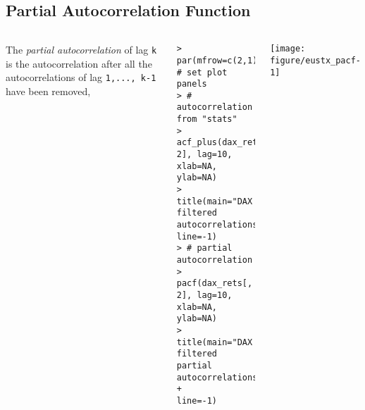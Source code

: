 \documentclass[10pt]{beamer}\usepackage[]{graphicx}\usepackage[]{color}
\makeatletter
\newenvironment{kframe}{%
 \def\at@end@of@kframe{}%
 \ifinner\ifhmode%
  \def\at@end@of@kframe{\end{minipage}}%
  \begin{minipage}{\columnwidth}%
 \fi\fi%
 \def\FrameCommand##1{\hskip\@totalleftmargin \hskip-\fboxsep
 \colorbox{shadecolor}{##1}\hskip-\fboxsep
     \hskip-\linewidth \hskip-\@totalleftmargin \hskip\columnwidth}%
 \MakeFramed {\advance\hsize-\width
   \@totalleftmargin\z@ \linewidth\hsize
   \@setminipage}}%
 {\par\unskip\endMakeFramed%
 \at@end@of@kframe}
\newenvironment{knitrout}{}{} %
\makeatother
\begin{document}
\subsection{Partial Autocorrelation Function}
\begin{frame}[fragile,t]{\subsecname}
\vspace{-1em}
\begin{block}{}
  \begin{columns}[T]
      The \emph{partial autocorrelation} of lag \texttt{k} is the autocorrelation after all the autocorrelations of lag \texttt{1,..., k-1} have been removed,
\begin{knitrout}\scriptsize
{}\color{fgcolor}\begin{kframe}
\begin{verbatim}
> par(mfrow=c(2,1))  # set plot panels
> # autocorrelation from "stats"
> acf_plus(dax_rets[, 2], lag=10, xlab=NA, ylab=NA)
> title(main="DAX filtered autocorrelations", line=-1)
> # partial autocorrelation
> pacf(dax_rets[, 2], lag=10, xlab=NA, ylab=NA)
> title(main="DAX filtered partial autocorrelations",
+       line=-1)
\end{verbatim}
\end{kframe}
\end{knitrout}
      \vspace{-2em}
      \texttt{[image: figure/eustx\_pacf-1]}
  \end{columns}
\end{block}

\end{frame}


\end{document}
